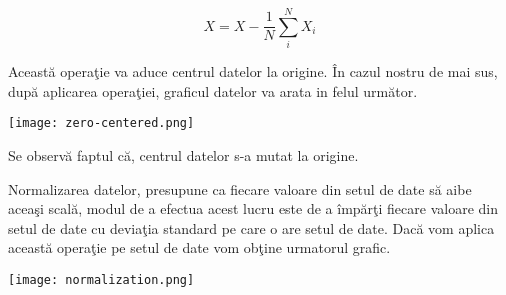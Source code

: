             $$ X = X - \frac{1}{N}\sum_i^N X_i$$
            
Aceast\u{a} opera\c{t}ie va aduce centrul datelor la origine. \^{I}n cazul nostru de mai sus, dup\u{a} aplicarea opera\c{t}iei, graficul datelor va arata in felul urm\u{a}tor.

\begin{center}
\texttt{[image: zero-centered.png]}
\end{center}

Se observ\u{a} faptul c\u{a}, centrul datelor s-a mutat la origine.

Normalizarea datelor, presupune ca fiecare valoare din setul de date s\u{a} aibe acea\c{s}i scal\u{a}, modul de a efectua acest lucru este de a \^{i}mp\u{a}r\c{t}i fiecare valoare din setul de date cu devia\c{t}ia standard pe care o are setul de date. Dac\u{a} vom aplica aceast\u{a} opera\c{t}ie pe setul de date vom ob\c{t}ine urmatorul grafic.

\begin{center}
\texttt{[image: normalization.png]}
\end{center}